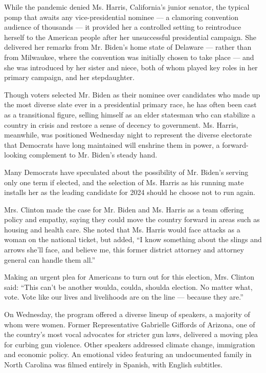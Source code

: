 While the pandemic denied Ms. Harris, California's junior senator, the
typical pomp that awaits any vice-presidential nominee --- a clamoring
convention audience of thousands --- it provided her a controlled
setting to reintroduce herself to the American people after her
unsuccessful presidential campaign. She delivered her remarks from Mr.
Biden's home state of Delaware --- rather than from Milwaukee, where the
convention was initially chosen to take place --- and she was introduced
by her sister and niece, both of whom played key roles in her primary
campaign, and her stepdaughter.

Though voters selected Mr. Biden as their nominee over candidates who
made up the most diverse slate ever in a presidential primary race, he
has often been cast as a transitional figure, selling himself as an
elder statesman who can stabilize a country in crisis and restore a
sense of decency to government. Ms. Harris, meanwhile, was positioned
Wednesday night to represent the diverse electorate that Democrats have
long maintained will enshrine them in power, a forward-looking
complement to Mr. Biden's steady hand.

Many Democrats have speculated about the possibility of Mr. Biden's
serving only one term if elected, and the selection of Ms. Harris as his
running mate installs her as the leading candidate for 2024 should he
choose not to run again.

Mrs. Clinton made the case for Mr. Biden and Ms. Harris as a team
offering policy and empathy, saying they could move the country forward
in areas such as housing and health care. She noted that Ms. Harris
would face attacks as a woman on the national ticket, but added, ``I
know something about the slings and arrows she'll face, and believe me,
this former district attorney and attorney general can handle them
all.''

Making an urgent plea for Americans to turn out for this election, Mrs.
Clinton said: ``This can't be another woulda, coulda, shoulda election.
No matter what, vote. Vote like our lives and livelihoods are on the
line --- because they are.''

On Wednesday, the program offered a diverse lineup of speakers, a
majority of whom were women. Former Representative Gabrielle Giffords of
Arizona, one of the country's most vocal advocates for stricter gun
laws, delivered a moving plea for curbing gun violence. Other speakers
addressed climate change, immigration and economic policy. An emotional
video featuring an undocumented family in North Carolina was filmed
entirely in Spanish, with English subtitles.

